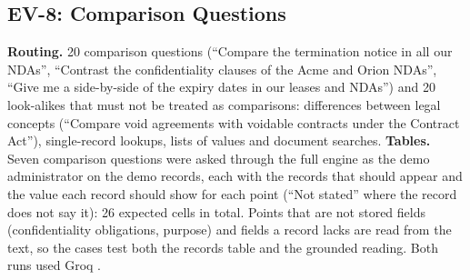 \subsection{EV-8: Comparison Questions}\label{sec:ev-compare}
\textbf{Routing.} 20 comparison questions (``Compare the termination notice in all our NDAs'', ``Contrast the
confidentiality clauses of the Acme and Orion NDAs'', ``Give me a side-by-side of the expiry dates in our leases
and NDAs'') and 20 look-alikes that must not be treated as comparisons: differences between legal concepts
(``Compare void agreements with voidable contracts under the Contract Act''), single-record lookups, lists of
values and document searches. \textbf{Tables.} Seven comparison questions were asked through the full engine as
the demo administrator on the demo records, each with the records that should appear and the value each record
should show for each point (``Not stated'' where the record does not say it): 26 expected cells in total. Points that
are not stored fields (confidentiality obligations, purpose) and fields a record lacks are read from the text,
so the cases test both the records table and the grounded reading. Both runs used Groq .

